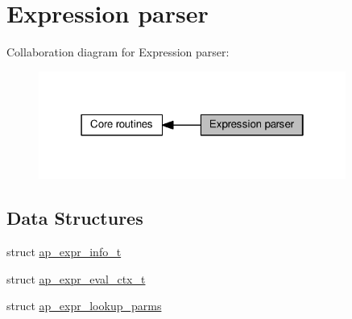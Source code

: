 \hypertarget{group__AP__EXPR}{}\section{Expression parser}
\label{group__AP__EXPR}
Collaboration diagram for Expression parser\+:
\nopagebreak
\begin{figure}[H]
\begin{center}
\leavevmode
\includegraphics[width=286pt]{group__AP__EXPR}
\end{center}
\end{figure}
\subsection*{Data Structures}
\begin{DoxyCompactItemize}
\item 
struct \hyperlink{structap__expr__info__t}{ap\+\_\+expr\+\_\+info\+\_\+t}
\item 
struct \hyperlink{structap__expr__eval__ctx__t}{ap\+\_\+expr\+\_\+eval\+\_\+ctx\+\_\+t}
\item 
struct \hyperlink{structap__expr__lookup__parms}{ap\+\_\+expr\+\_\+lookup\+\_\+parms}
\end{DoxyCompactItemize}
